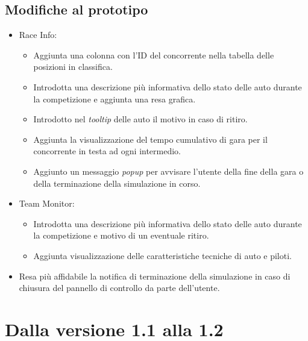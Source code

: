 \subsection*{Modifiche al prototipo}
\begin{itemize}
\item Race Info:
	\begin{itemize}
	\item Aggiunta una colonna con l'ID del concorrente nella tabella delle posizioni in classifica.
	\item Introdotta una descrizione più informativa dello stato delle auto durante la competizione e aggiunta una resa grafica.
	\item Introdotto nel \textit{tooltip} delle auto il motivo in caso di ritiro.
	\item Aggiunta la visualizzazione del tempo cumulativo di gara per il concorrente in testa ad ogni intermedio.
	\item Aggiunto un messaggio \textit{popup} per avvisare l'utente della fine della gara o della terminazione della simulazione in corso.
	\end{itemize}
\item Team Monitor:
	\begin{itemize}
	\item Introdotta una descrizione più informativa dello stato delle auto durante la competizione e motivo di un eventuale ritiro.
	\item Aggiunta visualizzazione delle caratteristiche tecniche di auto e piloti.
	\end{itemize}
\item Resa più affidabile la notifica di terminazione della simulazione in caso di chiusura del pannello di controllo da parte dell'utente.
\end{itemize}

\section{Dalla versione 1.1 alla 1.2}

